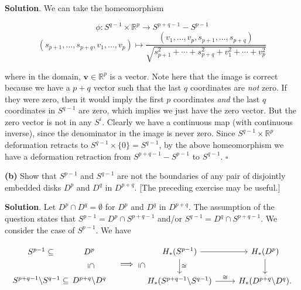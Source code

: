 \documentclass{article}
\newcommand{\R}{\mathbb{R}}
\begin{document}
\textbf{Solution}. We can take the homeomorphism

$$\phi: S^{q-1}\times \R^{p}\to S^{p+q-1}-S^{p-1}$$
$$(s_{p+1},\ldots, s_{p+q}, v_{1},\ldots, v_{p})\mapsto \frac{(v_{1},\ldots, v_{p}, s_{p+1},\ldots, s_{p+q})}{\sqrt{s_{p+1}^{2}+\cdots + s_{p+q}^{2} + v_{1}^{2} + \cdots + v_{p}^{2}}}$$

where in the domain, $\mathbf{v}\in \R^{p}$ is a vector. Note here that the image is correct because we have a $p + q$ vector such that the last $q$ coordinates are \textit{not} zero. If they were zero, then it would imply the first $p$ coordinates \textit{and} the last $q$ coordinates in $S^{q-1}$ are zero, which implies we just have the zero vector. But the zero vector is not in any $S^{i}$. Clearly we have a continuous map (with continuous inverse), since the denominator in the image is never zero. Since $S^{q-1}\times \R^{p}$ deformation retracts to $S^{q-1}\times \{0\} = S^{q-1}$, by the above homeomorphism we have a deformation retraction from $S^{p+q-1}-S^{p-1}$ to $S^{q-1}$. $\square$
\medskip

\textbf{(b)} Show that $S^{p-1}$ and $S^{q-1}$ are not the boundaries of any pair of disjointly embedded disks $D^{p}$ and $D^{q}$ in $D^{p+q}$. [The preceding exercise may be useful.]
\medskip

\textbf{Solution}.  Let $D^{p}\cap D^{q} = \emptyset$ for $D^{p}$ and $D^{q}$ in $D^{p+q}$. The assumption of the question states that $S^{p-1} = D^{p}\cap S^{p+q-1}$ and/or $S^{q-1} = D^{q}\cap S^{p+q-1}$. We consider the case of $S^{p-1}$. We have

\[\begin{tikzcd}[remember picture]
S^{p-1} \subseteq & \hspace{-1cm} D^{p}\\
S^{p+q-1}\textnormal{\textbackslash} S^{q-1} \subseteq & \hspace{-1cm} D^{p+q}\textnormal{\textbackslash} D^{q}
\end{tikzcd}
\begin{tikzpicture}[overlay, remember picture]
\path (\tikzcdmatrixname-1-1) to node[midway,sloped]{$\subseteq$}
(\tikzcdmatrixname-2-1); \hspace{-0.4cm}
\path (\tikzcdmatrixname-1-2) to  node[midway,sloped]{$\subseteq$} 
(\tikzcdmatrixname-2-2);\hspace{0.55cm}
\end{tikzpicture}\quad \Longrightarrow\quad \begin{tikzcd}
H_{\ast}(S^{p-1})\arrow{r}\arrow{d}{\cong} & H_{\ast}(D^{p})\arrow{d}\\
H_{\ast}(S^{p+q-1}\textnormal{\textbackslash} S^{q-1})\arrow{r}{\cong} & H_{\ast}(D^{p+q}\textnormal{\textbackslash} D^{q}).
\end{tikzcd}\]
\end{document}
